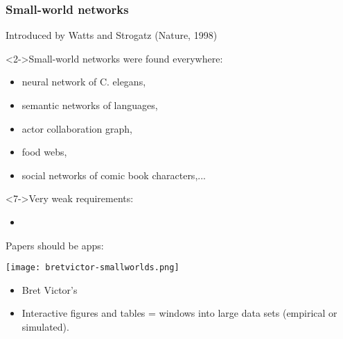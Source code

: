 \begin{frame}
  \frametitle{Small-world networks}

  \begin{block}{}
  Introduced by
  Watts and Strogatz (Nature, 1998)\cite{watts1998a}\\
  \end{block}

  \begin{block}<2->{Small-world networks were found everywhere:}
    \begin{itemize}
    \item<2-> neural network of C. elegans,
    \item<3-> semantic networks of languages,
    \item<4-> actor collaboration graph,
    \item<5-> food webs,
    \item<6-> social networks of comic book characters,...
    \end{itemize}
  \end{block}

  \begin{block}<7->{Very weak requirements:}
    \begin{itemize}
    \item<7-> 
    \end{itemize}
  \end{block}
  
\end{frame}

\begin{frame}

  \begin{block}{Papers should be apps:}
      \begin{center}
        \texttt{[image: bretvictor-smallworlds.png]}
      \end{center}
      \begin{itemize}
      \item 
        Bret Victor's 
      \item 
        Interactive figures and tables = windows into large data sets
        (empirical or simulated).
    \end{itemize}
  \end{block}

\end{frame}

